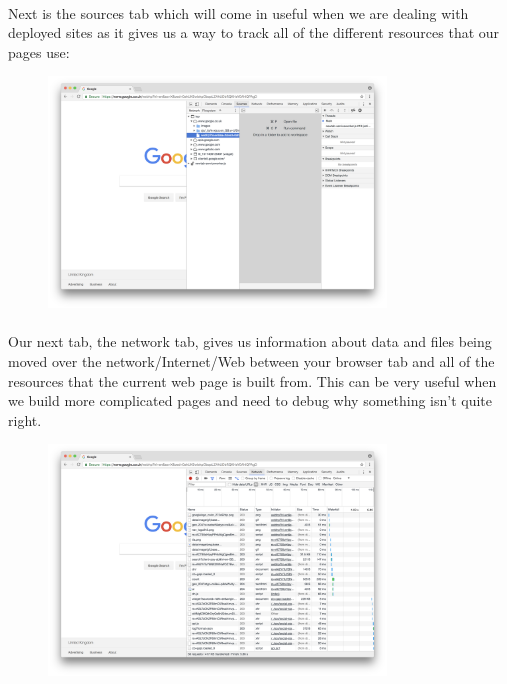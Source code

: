 \paragraph{} Next is the sources tab which will come in useful when we are dealing with deployed sites as it gives us a way to track all of the different resources that our pages use:


\begin{figure}[H]
\centering
\includegraphics[width=0.8\textwidth]{figures/devtools_sources.png}
\label{fig:devtools_sources}
\end{figure}

\paragraph{} Our next tab, the network tab, gives us information about data and files being moved over the network/Internet/Web between your browser tab and all of the resources that the current web page is built from. This can be very useful when we build more complicated pages and need to debug why something isn't quite right.

\begin{figure}[H]
\centering
\includegraphics[width=0.8\textwidth]{figures/devtools-network.png}
\label{fig:devtools-network}
\end{figure}


